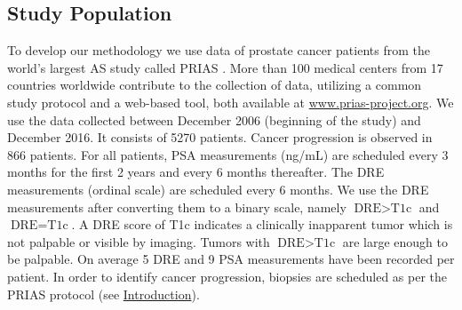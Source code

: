 \subsection{Study Population}
\label{subsec:study_population}
To develop our methodology we use data of prostate cancer patients from the world's largest AS study called PRIAS \cite{bokhorst2016decade}. More than 100 medical centers from 17 countries worldwide contribute to the collection of data, utilizing a common study protocol and a web-based tool, both available at \url{www.prias-project.org}. We use the data collected between December 2006 (beginning of the study) and December 2016. It consists of 5270 patients. Cancer progression is observed in 866 patients. For all patients, PSA measurements (ng/mL) are scheduled every 3 months for the first 2 years and every 6 months thereafter. The DRE measurements (ordinal scale) are scheduled every 6 months. We use the DRE measurements after converting them to a binary scale, namely $\mbox{DRE} > \mbox{T1c}$ and $\mbox{DRE} = \mbox{T1c}$. A DRE score of T1c\cite{schroder1992tnm} indicates a clinically inapparent tumor which is not palpable or visible by imaging. Tumors with $\mbox{DRE} > \mbox{T1c}$ are large enough to be palpable. On average 5 DRE and 9 PSA measurements have been recorded per patient. In order to identify cancer progression, biopsies are scheduled as per the PRIAS protocol (see \hyperref[sec:introduction]{Introduction}).